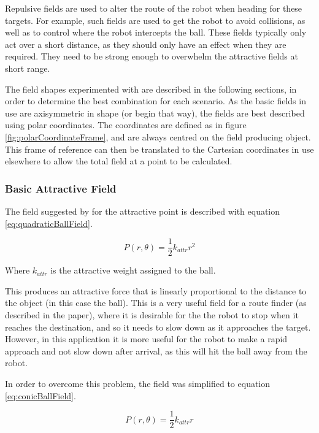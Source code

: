 \documentclass[10pt,british,english]{article}
\begin{document}
Repulsive fields are used to alter the route of the robot when heading for these targets. For example, such fields are used to get the robot to avoid collisions, as well as to control where the robot intercepts the ball. These fields typically only act over a short distance, as they should only have an effect when they are required. They need to be strong enough to overwhelm the attractive fields at short range.

The field shapes experimented with are described in the following sections, in order to determine the best combination for each scenario. As the basic fields in use are axisymmetric in shape (or begin that way), the fields are best described using polar coordinates. The coordinates are defined as in figure \ref{fig:polarCoordinateFrame}, and are always centred on the field producing object. This frame of reference can then be translated to the Cartesian coordinates in use elsewhere to allow the total field at a point to be calculated.

\subsubsection{Basic Attractive Field\label{sub:Basic-Attractive-Field}}

The field suggested by \cite{intelligentAlgorithmPathPlanning} for the attractive point is described with equation \ref{eq:quadraticBallField}.

\begin{equation}
P(r,\theta)=\frac{1}{2}k_{attr}r^{2}\label{eq:quadraticBallField}
\end{equation}

Where $k_{attr}$ is the attractive weight assigned to the ball.

This produces an attractive force that is linearly proportional to the distance to the object (in this case the ball). This is a very useful field for a route finder (as described in the paper), where it is desirable for the the robot to stop when it reaches the destination, and so it needs to slow down as it approaches the target. However, in this application it is more useful for the robot to make a rapid approach and not slow down after arrival, as this will hit the ball away from the robot.

In order to overcome this problem, the field was simplified to equation \ref{eq:conicBallField}.

\begin{equation}
P(r,\theta)=\frac{1}{2}k_{attr}r\label{eq:conicBallField}
\end{equation}
\end{document}
